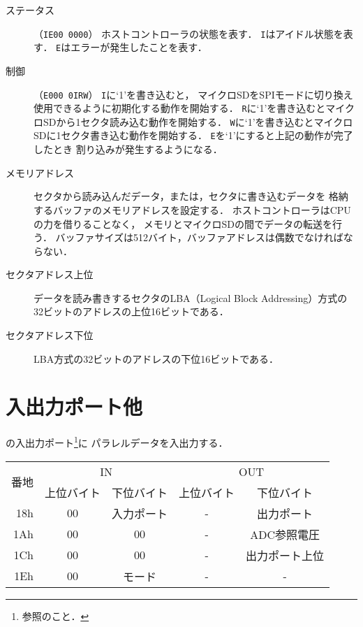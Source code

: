 \begin{description}
\item[ステータス]（\texttt{IE00 0000}）
  ホストコントローラの状態を表す．
  \texttt{I}はアイドル状態を表す．
  \texttt{E}はエラーが発生したことを表す．
\item[制御]（\texttt{E000 0IRW}）
  \texttt{I}に`1'を書き込むと，
  マイクロSDをSPIモードに切り換え使用できるように初期化する動作を開始する．
  \texttt{R}に`1'を書き込むとマイクロSDから1セクタ読み込む動作を開始する．
  \texttt{W}に`1'を書き込むとマイクロSDに1セクタ書き込む動作を開始する．
  \texttt{E}を`1'にすると上記の動作が完了したとき
  割り込みが発生するようになる．
\item[メモリアドレス]
  セクタから読み込んだデータ，または，セクタに書き込むデータを
  格納するバッファのメモリアドレスを設定する．
  ホストコントローラはCPUの力を借りることなく，
  メモリとマイクロSDの間でデータの転送を行う．
  バッファサイズは512バイト，バッファアドレスは偶数でなければならない．
\item[セクタアドレス上位]
  データを読み書きするセクタのLBA（Logical Block Addressing）方式の
  32ビットのアドレスの上位16ビットである．
\item[セクタアドレス下位]
  LBA方式の32ビットのアドレスの下位16ビットである．
\end{description}

\section{入出力ポート他}
{\tecS}の入出力ポート\footnote{参照のこと．}に
パラレルデータを入出力する．

\begin{center}
  \small\begin{tabular}{| r | c | c || c | c |}\hline
    \multirow{2}{*}{番地}
    & \multicolumn{2}{c||}{IN}
    & \multicolumn{2}{c|}{OUT}
    \\\cline{2-5}
         & 上位バイト & 下位バイト & 上位バイト & 下位バイト
    \\\hline\hline
    18h  &  00 & 入力ポート
         &  -  & 出力ポート \\\hline
    1Ah  &  00 & 00
         &  -  & ADC参照電圧 \\\hline
    1Ch  &  00 & 00
         &  -  & 出力ポート上位 \\\hline
    1Eh  &  00 & モード
         &  - & - \\\hline
  \end{tabular}
\end{center}

